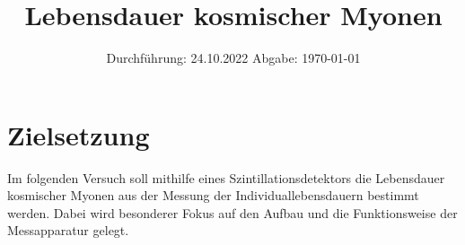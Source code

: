 

\usepackage[nolist,nohyperlinks]{acronym}

\usepackage{longtable}

\subject{V01}
\title{Lebensdauer kosmischer Myonen}
\date{
    Durchführung: 24.10.2022
     \hspace{3em}
    Abgabe: \today %
}


\maketitle
\thispagestyle{empty}
\tableofcontents
\newpage

\section{Zielsetzung}

    Im folgenden Versuch soll mithilfe eines Szintillationsdetektors die Lebensdauer kosmischer Myonen aus der Messung der Individuallebensdauern bestimmt werden.
    Dabei wird besonderer Fokus auf den Aufbau und die Funktionsweise der Messapparatur gelegt.


\clearpage


\clearpage


\clearpage


\clearpage

\printbibliography
\clearpage

\appendix



